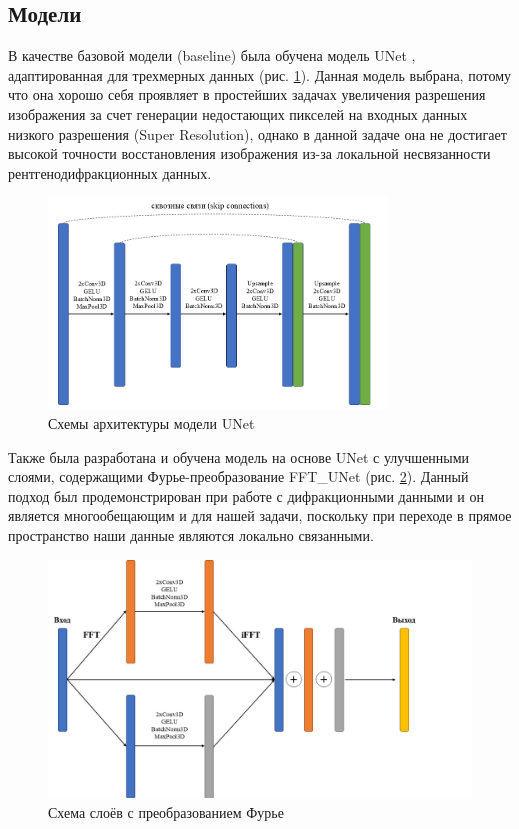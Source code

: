 \subsection{Модели}

В качестве базовой модели (baseline) была обучена модель UNet \cite{ronneberger_u-net_2015}, адаптированная для трехмерных данных (рис. \ref{unet}). Данная модель выбрана, потому что она хорошо себя проявляет в простейших задачах увеличения разрешения изображения за счет генерации недостающих пикселей на входных данных низкого разрешения (Super Resolution), однако в данной задаче она не достигает высокой точности восстановления изображения из-за локальной несвязанности рентгенодифракционных данных. 

\begin{figure}[H]
    \centering
    \includegraphics[width=0.8\textwidth]{figures/unet_arch.png}
    \caption{Схемы архитектуры модели UNet}
    \label{unet}
\end{figure}

Также была разработана и обучена модель на основе UNet с улучшенными слоями, содержащими Фурье-преобразование FFT\_UNet (рис. \ref{fft_unet}). Данный подход был продемонстрирован \cite{yang_hionet_2023} при работе с дифракционными данными и он является многообещающим и для нашей задачи, поскольку при переходе в прямое пространство наши данные являются локально связанными.


\begin{figure}[H]
    \centering
    \includegraphics[width=1\textwidth]{figures/fft_arch.jpg}
    \caption{Схема слоёв с преобразованием Фурье}
    \label{fft_unet}
\end{figure}


